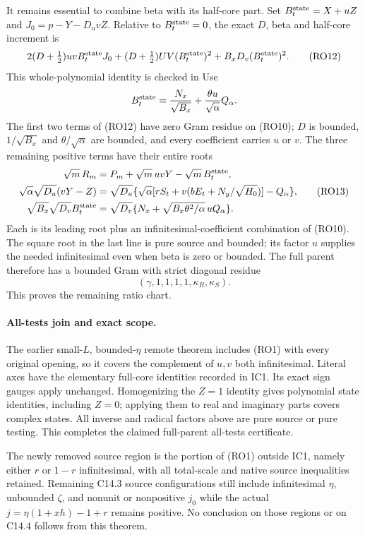 It remains essential to combine beta with its half-core part. Set
$B_t^{\rm state}=X+uZ$ and $J_0=p-Y-D_uvZ$. Relative to
$B_t^{\rm state}=0$, the exact $D$, beta and half-core increment is
\[
 2(D+\tfrac12)uvB_t^{\rm state}J_0
 +(D+\tfrac12)UV(B_t^{\rm state})^2
 +B_xD_v(B_t^{\rm state})^2.                          \tag{RO12}
\]
This whole-polynomial identity is checked in  Use
\[
 B_t^{\rm state}={N_x\over\sqrt{B_x}}
               +{\theta u\over\sqrt\alpha}Q_\alpha.
\]
The first two terms of (RO12) have zero Gram residue on (RO10);
$D$ is bounded, $1/\sqrt{B_x}$ and $\theta/\sqrt\alpha$
are bounded, and every coefficient carries $u$ or $v$.
The three remaining positive terms have their entire roots
\[
\begin{aligned}
 \sqrt m\,R_m&=P_m+\sqrt m\,uvY-\sqrt m\,B_t^{\rm state},\\
 \sqrt\alpha\sqrt{D_u}(vY-Z)
   &=\sqrt{D_u}\{\sqrt\alpha[rS_t+v(bE_t+N_y/\sqrt{H_0})]
                         -Q_\alpha\},\\
 \sqrt{B_x}\sqrt{D_v}B_t^{\rm state}
   &=\sqrt{D_v}\{N_x+\sqrt{B_x\theta^2/\alpha}\,uQ_\alpha\}.
\end{aligned}                                                    \tag{RO13}
\]
Each is its leading root plus an infinitesimal-coefficient combination
of (RO10). The square root in the last line is pure source and bounded;
its factor $u$ supplies the needed infinitesimal even when beta is
zero or bounded. The full parent therefore has a bounded Gram with
strict diagonal residue
\[
                 (\gamma,1,1,1,1,\kappa_R,\kappa_S).
                                                               \tag{RO14}
\]
This proves the remaining ratio chart.

\paragraph{All-tests join and exact scope.}
The earlier small-$L$, bounded-$\eta$ remote theorem includes (RO1)
with every original opening, so it covers the complement of
$u,v$ both infinitesimal. Literal axes have the elementary full-core
identities recorded in IC1. Its exact sign gauges apply unchanged.
Homogenizing the $Z=1$ identity gives polynomial state identities,
including $Z=0$; applying them to real and imaginary parts covers
complex states. All inverse and radical factors above are pure
source or pure testing. This completes the claimed full-parent
all-tests certificate.

The newly removed source region is the portion of (RO1) outside IC1,
namely either $r$ or $1-r$ infinitesimal, with all total-scale and
native source inequalities retained. Remaining C14.3 source
configurations still include infinitesimal $\eta$, unbounded
$\zeta$, and nonunit or nonpositive $j_0$ while the actual
$j=\eta(1+xh)-1+r$ remains positive. No conclusion on those
regions or on C14.4 follows from this theorem.

